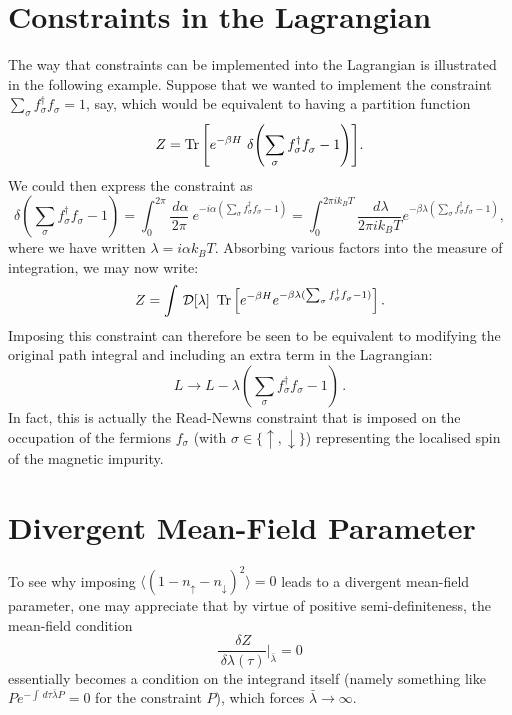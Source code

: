 
\appendix

\section{Constraints in the Lagrangian}
\label{sec:Constraints}

The way that constraints can be implemented into the Lagrangian is illustrated in the following example. Suppose that we wanted to implement the constraint $ \sum_{\sigma} f^{\dagger}_{\sigma} f^{}_{\sigma} = 1 $, say, which would be equivalent to having a partition function $$ Z = \operatorname{Tr}{\left[ e^{- \beta H}~\delta{\left( \sum_{\sigma} f^{\dagger}_{\sigma} f^{}_{\sigma} - 1 \right)} \right]} . $$ We could then express the constraint as $$ \delta{\left( \sum_{\sigma} f^{\dagger}_{\sigma} f^{}_{\sigma} - 1 \right)} = \int_{0}^{2 \pi} \frac{\,d\alpha}{2 \pi}~e^{- i \alpha (\sum_{\sigma} f^{\dagger}_{\sigma} f^{}_{\sigma} - 1)} = \int_{0}^{2 \pi i k_B T} \frac{\,d \lambda}{2 \pi i k_B T} e^{- \beta \lambda (\sum_{\sigma} f^{\dagger}_{\sigma} f^{}_{\sigma} - 1)}, $$ where we have written $ \lambda = i \alpha k_B T $. Absorbing various factors into the measure of integration, we may now write: $$ Z = \int \, \mathcal{D} [\lambda]~\operatorname{Tr}{\left[ e^{- \beta H} e^{- \beta \lambda (\sum_{\sigma} f^{\dagger}_{\sigma} f^{}_{\sigma} - 1)} \right]} \,. $$ Imposing this constraint can therefore be seen to be equivalent to modifying the original path integral and including an extra term in the Lagrangian: $$ L \rightarrow L - \lambda \left( \sum_{\sigma} f^{\dagger}_{\sigma} f^{}_{\sigma} - 1 \right) \,. $$ In fact, this is actually the Read-Newns constraint that is imposed on the occupation of the fermions $ f^{}_{\sigma} $ (with $ \sigma \in \{ \uparrow , \downarrow \}$) representing the localised spin of the magnetic impurity.

\section{Divergent Mean-Field Parameter}
\label{sec:Divergence}

To see why imposing $ \langle (1 - n_{\uparrow} - n_{\downarrow})^2 \rangle = 0 $ leads to a divergent mean-field parameter, one may appreciate that by virtue of positive semi-definiteness, the mean-field condition \[ \frac{\, \delta Z}{\, \delta \lambda(\tau)} \Bigr|_{\bar{\lambda}} = 0 \] essentially becomes a condition on the integrand itself (namely something like $ P e^{- \int \, d\tau \bar{\lambda} P} = 0 $ for the constraint $ P $), which forces $ \bar{\lambda} \rightarrow \infty $.

